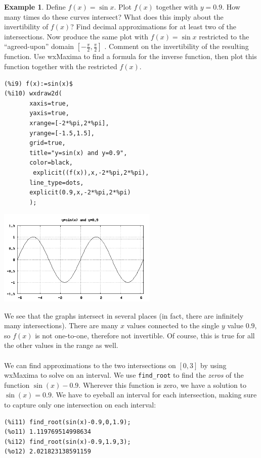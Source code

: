 \documentclass[10.5pt,twoside]{report}
\theoremstyle{definition}
\newtheorem{exmp}{Example}[section]
\begin{document}
\begin{exmp}

Define $f(x)=\sin{x}$.  Plot $f(x)$ together with $y=0.9$.  How many times do these curves intersect?  What does this imply about the invertibility of $f(x)$?  Find decimal approximations for at least two of the intersections.  Now produce the same plot with $f(x)=\sin{x}$ restricted to the ``agreed-upon'' domain $[-\frac{\pi}{2},\frac{\pi}{2}]$ .  Comment on the invertibility of the resulting function.  Use wxMaxima to find a formula for the inverse function, then plot this function together with the restricted $f(x)$.  \\

\begin{verbatim}
(%i9) f(x):=sin(x)$
(%i10) wxdraw2d(
       xaxis=true,
       yaxis=true,
       xrange=[-2*%pi,2*%pi],
       yrange=[-1.5,1.5],
       grid=true,
       title="y=sin(x) and y=0.9",
       color=black,
        explicit((f(x)),x,-2*%pi,2*%pi),
       line_type=dots,
       explicit(0.9,x,-2*%pi,2*%pi)
       ); 
\end{verbatim}

\includegraphics[width=3in]{example_2_4_2_1}

We see that the graphs intersect in several places (in fact, there are infinitely many intersections).  There are many $x$ values connected to the single $y$ value $0.9$, so $f(x)$ is not one-to-one, therefore not invertible.  Of course, this is true for all the other values in the range as well.  \\
${}$\\
We can find approximations to the two intersections on $[0,3]$ by using wxMaxima to solve on an interval.  We use \verb|find_root| to find the \textit{zeros} of the function $\sin(x)-0.9$.  Wherever this function is zero, we have a solution to $\sin(x)=0.9$.  We have to eyeball an interval for each intersection, making sure to capture only one intersection on each interval:

\begin{verbatim}
(%i11) find_root(sin(x)-0.9,0,1.9);
(%o11) 1.119769514998634
(%i12) find_root(sin(x)-0.9,1.9,3);
(%o12) 2.021823138591159
\end{verbatim}


\end{exmp}
\end{document}
